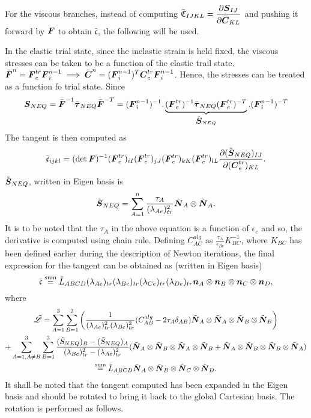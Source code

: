 \documentclass[11pt,twoside,TimesRoman]{article}
\newcommand{\parder}[2]{{\dfrac{\partial #1}{\partial #2}}}
\begin{document}
For the viscous branches, instead of computing $\bar{\mathfrak{C}}_{IJKL} = \parder{\bfS_{IJ}}{\bfCbar_{KL}}$ and pushing it forward by $\mbox{\boldmath $F$}$ to obtain $	\bar{\mathfrak{c}}$, the following will be used. 

In the elastic trial state, since the inelastic strain is held fixed, the viscous stresses can be taken to be a function of the elastic trail state. $\bar{\mbox{\boldmath $F$}}^n =\mbox{\boldmath $F$}_e^{tr} \mbox{\boldmath $F$}_i^{n-1} \implies \bar{\mbox{\boldmath $C$}}^n = (\mbox{\boldmath $F$}_i^{n-1})^T \mbox{\boldmath $C$}_e^{tr} \mbox{\boldmath $F$}_i^{n-1}$. Hence, the stresses can be treated as a function fo trial state. Since
\begin{equation}
	 \mbox{\boldmath $S$}_{NEQ}  = \bar{\mbox{\boldmath $F$}}^{-1} \bar{\mbox{\boldmath $\tau$}}_{NEQ} \bar{\mbox{\boldmath $F$}}^{-T} = (\mbox{\boldmath $F$}_i^{n-1})^{-1}.	 \underbrace{(\mbox{\boldmath $F$}_e^{tr})^{-1} \bar{\mbox{\boldmath $\tau$}}_{NEQ} (\mbox{\boldmath $F$}_e^{tr})^{-T}}_{\tilde{\mbox{\boldmath $S$}}_{NEQ}}  .(\mbox{\boldmath $F$}_i^{n-1})^{-T}
\end{equation}
The tangent is then computed as 
\begin{equation}
	\bar{\mathfrak{c}}_{ijkl} = (\det \bfF)^{-1} (\bfF_e^{tr})_{iI} (\bfF_e^{tr})_{jJ} (\bfF_e^{tr})_{kK} (\bfF_e^{tr})_{lL} \parder{(\tilde{\bfS}_{NEQ})_{IJ}}{(\bfC_e^{tr})_{KL}}.
\end{equation}
$\tilde{\mbox{\boldmath $S$}}_{NEQ}$, written in Eigen basis is
\begin{equation}
	\tilde{\mbox{\boldmath $S$}}_{NEQ} = \sum_{A=1}^{n} \frac{\tau_A}{(\lambda_{Ae})_{tr}^2} \tilde{\mbox{\boldmath $N$}}_A \otimes \tilde{\mbox{\boldmath $N$}}_A.
\end{equation}
It is to be noted that the $\tau_A$ in the above equation is a function of $\epsilon_e$ and so, the derivative is computed using chain rule. Defining $C^{alg}_{AC}$ as $\frac{\tau_A}{\epsilon_{Be}} K_{BC}^{-1}$, where $K_{BC}$ has been defined earlier during the description of Newton iterations, the final expression for the tangent can be obtained as (written in Eigen basis)
\begin{equation}
 	\bar{\mathfrak{c}} \stackrel{\text{sum}}{=} \tilde{L}_{ABCD} (\lambda_{Ae})_{tr} (\lambda_{Be})_{tr} (\lambda_{Ce})_{tr} (\lambda_{De})_{tr} \mbox{\boldmath $n$}_A \otimes \mbox{\boldmath $n$}_B \otimes \mbox{\boldmath $n$}_C \otimes \mbox{\boldmath $n$}_D,
\end{equation}
where
\begin{multline}
	\tilde{\mathscr{L}} = \sum_{A=1}^{3}\sum_{B=1}^{3}\left(   \frac{1}{(\lambda_{Ae})_{tr}^2(\lambda_{Be})_{tr}^2} (C^{alg}_{AB} - 2\tau_A \delta_{AB}) \tilde{\mbox{\boldmath $N$}}_A \otimes \tilde{\mbox{\boldmath $N$}}_A \otimes \tilde{\mbox{\boldmath $N$}}_B \otimes \tilde{\mbox{\boldmath $N$}}_B  \right) \\
	+ \sum_{A=1,A\neq B}^{3}\sum_{B=1}^{3}\frac{(\tilde{S}_{NEQ})_B-(\tilde{S}_{NEQ})_A}{(\lambda_{Be})_{tr}^2-(\lambda_{Ae})_{tr}^2}(  \tilde{\mbox{\boldmath $N$}}_A \otimes \tilde{\mbox{\boldmath $N$}}_B \otimes \tilde{\mbox{\boldmath $N$}}_A \otimes \tilde{\mbox{\boldmath $N$}}_B  +  \tilde{\mbox{\boldmath $N$}}_A \otimes \tilde{\mbox{\boldmath $N$}}_B \otimes \tilde{\mbox{\boldmath $N$}}_B \otimes \tilde{\mbox{\boldmath $N$}}_A  ) \\
	\stackrel{\text{sum}}{=}  \tilde{L}_{ABCD}\tilde{\mbox{\boldmath $N$}}_A \otimes \tilde{\mbox{\boldmath $N$}}_B \otimes \tilde{\mbox{\boldmath $N$}}_C \otimes \tilde{\mbox{\boldmath $N$}}_D.
\end{multline}
It shall be noted that the tangent computed has been expanded in the Eigen basis and should be rotated to bring it back to the global Cartesian basis. The rotation is performed as follows.
\end{document}
